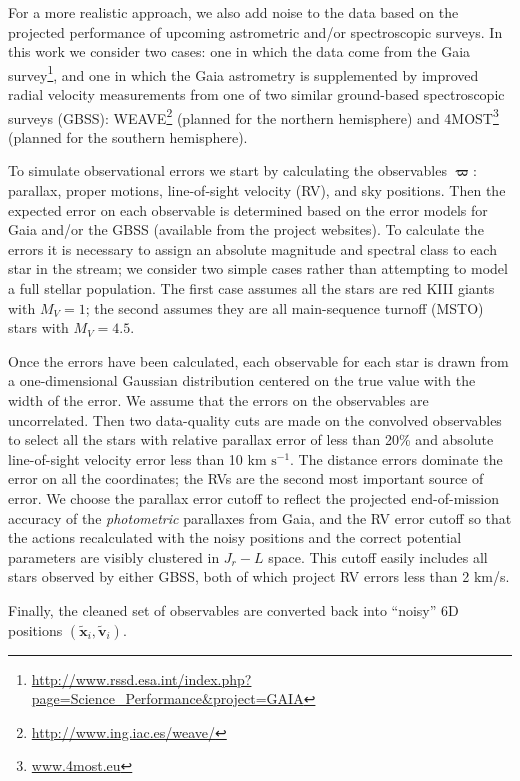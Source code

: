 \documentclass[useAMS,usenatbib,a4paper]{mn2e}
\newcommand{\unit}[2]{\ensuremath{\textrm{#1}^{#2}}}
\begin{document}
For a more realistic approach, we also add noise to the data based on the projected performance of upcoming astrometric and/or spectroscopic surveys. In this work we consider two cases: one in which the data come from the Gaia survey\footnote{\url{http://www.rssd.esa.int/index.php?page=Science_Performance&project=GAIA}}, and one in which the Gaia astrometry is supplemented by improved radial velocity measurements from one of two similar ground-based spectroscopic surveys (GBSS): WEAVE\footnote{\url{http://www.ing.iac.es/weave/}} (planned for the northern hemisphere) and 4MOST\footnote{\url{www.4most.eu}} (planned for the southern hemisphere). 

To simulate observational errors we start by calculating the observables $\mathbf{\varpi}$: parallax, proper motions, line-of-sight velocity (RV), and sky positions.  Then the expected error on each observable is determined based on the error models for Gaia and/or the GBSS (available from the project websites). To calculate the errors it is necessary to assign an absolute magnitude and spectral class to each star in the stream; we consider two simple cases rather than attempting to model a full stellar population. The first case assumes all the stars are red KIII giants with $M_V = 1$; the second assumes they are all main-sequence turnoff (MSTO) stars with $M_V = 4.5$. 

Once the errors have been calculated, each observable for each star is drawn from a one-dimensional Gaussian distribution centered on the true value with the width of the error. We assume that the errors on the observables are uncorrelated.  Then two data-quality cuts are made on the convolved observables to select all the stars with relative parallax error of less than 20\% and absolute line-of-sight velocity error less than 10 km \unit{s}{-1}. The distance errors dominate the error on all the coordinates; the RVs are the second most important source of error. We choose the parallax error cutoff to reflect the projected end-of-mission accuracy of the \emph{photometric} parallaxes from Gaia, and the RV error cutoff so that the actions recalculated with the noisy positions and the correct potential parameters are visibly clustered in $J_r-L$ space. This cutoff easily includes all stars observed by either GBSS, both of which project RV errors less than 2 km/s.

Finally, the cleaned set of observables are converted back into ``noisy'' 6D positions $(\tilde{\mathbf{x}}_i,\tilde{\mathbf{v}}_i)$. 
\end{document}
